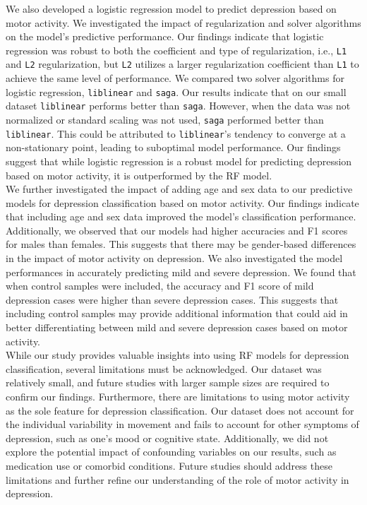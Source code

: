 \documentclass[11pt,a4paper]{article}
\newcommand{\noi}{\noindent}
\begin{document}
\noi
We also developed a logistic regression model to predict depression based on motor activity. We investigated the impact of regularization and solver algorithms on the model's predictive performance. Our findings indicate that logistic regression was robust to both the coefficient and type of regularization, i.e., \texttt{L1} and \texttt{L2} regularization, but \texttt{L2} utilizes a larger regularization coefficient than \texttt{L1} to achieve the same level of performance. We compared two solver algorithms for logistic regression, \texttt{liblinear} and \texttt{saga}. Our results indicate that on our small dataset \texttt{liblinear} performs better than \texttt{saga}. However, when the data was not normalized or standard scaling was not used, \texttt{saga} performed better than \texttt{liblinear}. This could be attributed to \texttt{liblinear}'s tendency to converge at a non-stationary point, leading to suboptimal model performance. Our findings suggest that while logistic regression is a robust model for predicting depression based on motor activity, it is outperformed by the RF model.\\

\noi
We further investigated the impact of adding age and sex data to our predictive models for depression classification based on motor activity. Our findings indicate that including age and sex data improved the model's classification performance. Additionally, we observed that our models had higher accuracies and F1 scores for males than females. This suggests that there may be gender-based differences in the impact of motor activity on depression. We also investigated the model performances in accurately predicting mild and severe depression. We found that when control samples were included, the accuracy and F1 score of mild depression cases were higher than severe depression cases. This suggests that including control samples may provide additional information that could aid in better differentiating between mild and severe depression cases based on motor activity.\\

\noi
While our study provides valuable insights into using RF models for depression classification, several limitations must be acknowledged. Our dataset was relatively small, and future studies with larger sample sizes are required to confirm our findings. Furthermore, there are limitations to using motor activity as the sole feature for depression classification. Our dataset does not account for the individual variability in movement and fails to account for other symptoms of depression, such as one's mood or cognitive state. Additionally, we did not explore the potential impact of confounding variables on our results, such as medication use or comorbid conditions. Future studies should address these limitations and further refine our understanding of the role of motor activity in depression.



\break


\end{document}
